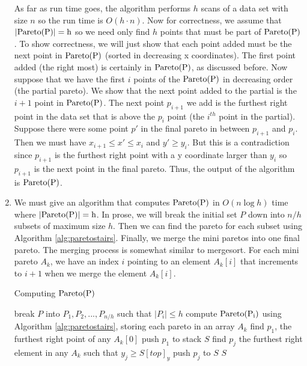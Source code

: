 \documentclass[11pt]{article}
\newcommand{\pareto}[1]{\rm{Pareto}(#1)}
\begin{document}
\begin{enumerate}
    As far as run time goes, the algorithm performs $h$ scans of a data set with size $n$ so the run time is $O(h \cdot n)$.
    Now for correctness, we assume that $|\pareto{P}| = h$ so we need only find $h$ points that must be part of $\pareto{P}$.
    To show correctness, we will just show that each point added must be the next point in $\pareto{P}$ (sorted in decreasing x coordinates).
    The first point added (the right most) is certainly in $\pareto{P}$, as discussed before.
    Now suppose that we have the first $i$ points of the $\pareto{P}$ in decreasing order (the partial pareto).
    We show that the next point added to the partial is the $i+1$ point in $\pareto{P}$.
    The next point $p_{i+1}$ we add is the furthest right point in the data set that is above the $p_i$ point (the $i^{th}$ point in the partial).
    Suppose there were some point $p'$ in the final pareto in between $p_{i+1}$ and $p_i$.
    Then we must have $x_{i+1} \leq x' \leq x_i$ and $y' \geq y_i$.
    But this is a contradiction since $p_{i+1}$ is the furthest right point with a y coordinate larger than $y_i$ so $p_{i+1}$ is the next point in the final pareto.
    Thus, the output of the algorithm is $\pareto{P}$.

    \item We must give an algorithm that computes $\pareto{P}$ in $O(n \log h)$ time where $|\pareto{P}| = h$.
    In prose, we will break the initial set $P$ down into $n/h$ subsets of maximum size $h$.
    Then we can find the pareto for each subset using Algorithm \ref{alg:paretostairs}.
    Finally, we merge the mini paretos into one final pareto.
    The merging process is somewhat similar to mergesort.
    For each mini pareto $A_k$, we have an index $i$ pointing to an element $A_k[i]$ that increments to $i+1$ when we merge the element $A_k[i]$.

    \begin{algorithm}
    \caption{Computing $\pareto{P}$}
    \label{alg:paretochan}
        \begin{algorithmic}[1]
            \State break $P$ into $P_1, P_2, ..., P_{n/h}$ such that $|P_i| \leq h$
            \State compute $\pareto{P_i}$ using Algorithm \ref{alg:paretostairs}, storing each pareto in an array $A_k$
            \State find $p_1$, the furthest right point of any $A_k[0]$
            \State push $p_1$ to stack $S$
                \State find $p_j$ the furthest right element in any $A_k$ such that $y_j \geq S[top]_y$
                \State push $p_j$ to $S$
            \EndFor
            \State \Return $S$
        \EndFunction
        \end{algorithmic}
    \end{algorithm}


\end{enumerate}
\end{document}
